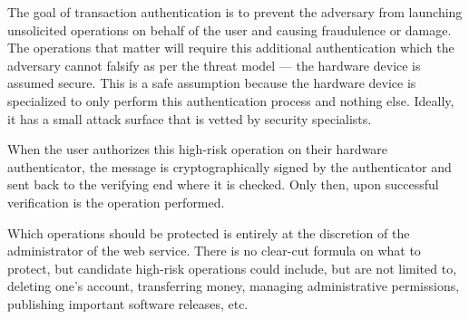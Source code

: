 The goal of transaction authentication is to prevent the adversary from launching unsolicited operations on behalf of the user and causing fraudulence or damage. The operations that matter will require this additional authentication which the adversary cannot falsify as per the threat model --- the hardware device is assumed secure. This is a safe assumption because the hardware device is specialized to only perform this authentication process and nothing else. Ideally, it has a small attack surface that is vetted by security specialists. 

When the user authorizes this high-risk operation on their hardware authenticator, the message is cryptographically signed by the authenticator and sent back to the verifying end where it is checked. Only then, upon successful verification is the operation performed. 

Which operations should be protected is entirely at the discretion of the administrator of the web service. There is no clear-cut formula on what to protect, but candidate high-risk operations could include, but are not limited to, deleting one's account, transferring money, managing administrative permissions, publishing important software releases, etc. 







